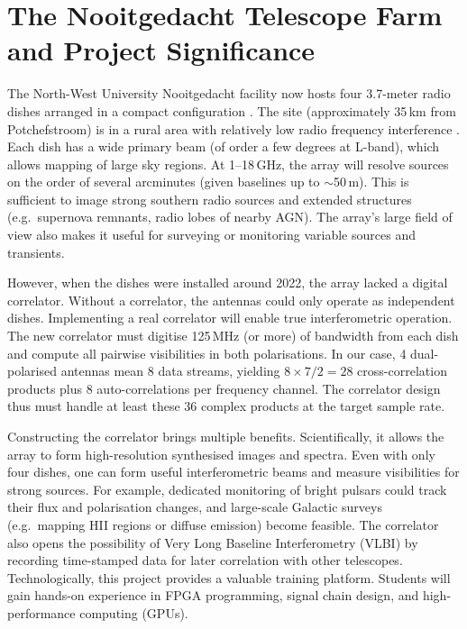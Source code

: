     \section{The Nooitgedacht Telescope Farm and Project Significance}
    The North-West University Nooitgedacht facility now hosts four 3.7-meter radio dishes arranged in a compact configuration \cite{Chibueze2023}. The site (approximately 35\,km from Potchefstroom) is in a rural area with relatively low radio frequency interference \cite{Chibueze2023}. Each dish has a wide primary beam (of order a few degrees at L-band), which allows mapping of large sky regions. At 1–18\,GHz, the array will resolve sources on the order of several arcminutes (given baselines up to $\sim$50\,m). This is sufficient to image strong southern radio sources and extended structures (e.g.\ supernova remnants, radio lobes of nearby AGN). The array’s large field of view also makes it useful for surveying or monitoring variable sources and transients.
    
    However, when the dishes were installed around 2022, the array lacked a digital correlator. Without a correlator, the antennas could only operate as independent dishes. Implementing a real correlator will enable true interferometric operation. The new correlator must digitise 125\,MHz (or more) of bandwidth from each dish and compute all pairwise visibilities in both polarisations. In our case, 4 dual-polarised antennas mean 8 data streams, yielding $8\times7/2=28$ cross-correlation products plus 8 auto-correlations per frequency channel. The correlator design thus must handle at least these 36 complex products at the target sample rate.
    
    Constructing the correlator brings multiple benefits. Scientifically, it allows the array to form high-resolution synthesised images and spectra. Even with only four dishes, one can form useful interferometric beams and measure visibilities for strong sources. For example, dedicated monitoring of bright pulsars could track their flux and polarisation changes, and large-scale Galactic surveys (e.g.\ mapping HII regions or diffuse emission) become feasible. The correlator also opens the possibility of Very Long Baseline Interferometry (VLBI) by recording time-stamped data for later correlation with other telescopes. Technologically, this project provides a valuable training platform. Students will gain hands-on experience in FPGA programming, signal chain design, and high-performance computing (GPUs). 
    
